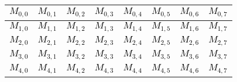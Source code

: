 \documentclass[pdflatex,sn-mathphys]{sn-jnl}%
\theoremstyle{thmstyleone}%
\theoremstyle{thmstyletwo}%
\theoremstyle{thmstylethree}%
\begin{document}
\medskip

\begin{center}
        \begin{tabular}{|p{0.83cm}|p{0.83cm}|p{0.83cm}|p{0.83cm}|p{0.83cm}|p{0.83cm}|p{0.83cm}|p{0.83cm}|}
        \hline
            \cellcolor{black!0}\textcolor{black}{$M_{0,0}$} & \cellcolor{black!0}\textcolor{black}{$M_{0,1}$} & \cellcolor{black!0}\textcolor{black}{$M_{0,2}$} & \cellcolor{black!0}\textcolor{black}{$M_{0,3}$} & \cellcolor{black!0}\textcolor{black}{$M_{0,4}$} & \cellcolor{black!0}\textcolor{black}{$M_{0,5}$} & \cellcolor{black!0}\textcolor{black}{$M_{0,6}$} & \cellcolor{black!0}\textcolor{black}{$M_{0,7}$} \\
        \hline
         \cellcolor{black!0}\textcolor{black}{$M_{1,0}$} & \cellcolor{black!0}\textcolor{black}{$M_{1,1}$} & \cellcolor{black!0}\textcolor{black}{$M_{1,2}$} & \cellcolor{black!0}\textcolor{black}{$M_{1,3}$} & \cellcolor{black!0}\textcolor{black}{$M_{1,4}$} & \cellcolor{black!0}\textcolor{black}{$M_{1,5}$} & \cellcolor{black!0}\textcolor{black}{$M_{1,6}$} & \cellcolor{black!0}\textcolor{black}{$M_{1,7}$}\\
        \hline
            \cellcolor{black!0}\textcolor{black}{$M_{2,0}$} & \cellcolor{black!0}\textcolor{black}{$M_{2,1}$} & \cellcolor{green!50}\textcolor{black}{$M_{2,2}$} & \cellcolor{black!0}\textcolor{black}{$M_{2,3}$} & \cellcolor{black!0}\textcolor{black}{$M_{2,4}$} & \cellcolor{red!50}\textcolor{black}{$M_{2,5}$} & \cellcolor{black!0}\textcolor{black}{$M_{2,6}$} & \cellcolor{black!0}\textcolor{black}{$M_{2,7}$}\\
        \hline
            \cellcolor{black!0}\textcolor{black}{$M_{3,0}$} & \cellcolor{black!0}\textcolor{black}{$M_{3,1}$} & \cellcolor{black!0}\textcolor{black}{$M_{3,2}$} & \cellcolor{black!0}\textcolor{black}{$M_{3,3}$} & \cellcolor{black!0}\textcolor{black}{$M_{3,4}$} & \cellcolor{black!0}\textcolor{black}{$M_{3,5}$} & \cellcolor{black!0}\textcolor{black}{$M_{3,6}$} & 
           \cellcolor{black!0}\textcolor{black}{$M_{3,7}$}\\
        \hline
            \cellcolor{black!0}\textcolor{black}{$M_{4,0}$} & \cellcolor{black!0}\textcolor{black}{$M_{4,1}$} & \cellcolor{black!0}\textcolor{black}{$M_{4,2}$} & \cellcolor{black!0}\textcolor{black}{$M_{4,3}$} & \cellcolor{black!0}\textcolor{black}{$M_{4,4}$} & \cellcolor{black!0}\textcolor{black}{$M_{4,5}$} & \cellcolor{black!0}\textcolor{black}{$M_{4,6}$} & \cellcolor{black!0}\textcolor{black}{$M_{4,7}$}\\
        \hline

\end{tabular}
\end{center}
\end{document}
